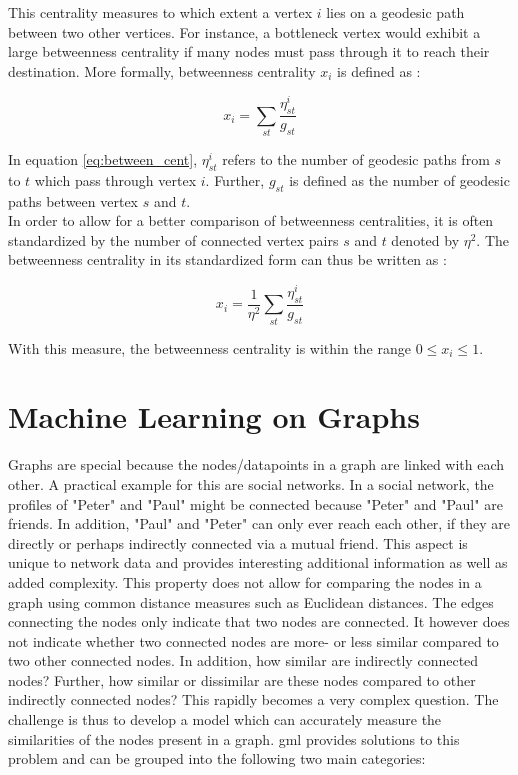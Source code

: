 	\noindent This centrality measures to which extent a vertex $i$ lies on 
	a geodesic path between two other vertices. For instance, a bottleneck 
	vertex would exhibit a large betweenness centrality if many nodes must pass 
	through it to reach their destination. More formally, betweenness 
	centrality $x_i$ is defined as \citep[p. 187]{Newman2010}:

	\begin{equation}
		x_i = \sum_{st} \frac{\eta_{st}^i}{g_{st}}
		\label{eq:between_cent}
	\end{equation}

	\noindent In equation \ref{eq:between_cent}, $\eta_{st}^i$ refers to the 
	number of geodesic paths from $s$ to $t$ which pass through vertex $i$. 
	Further, $g_{st}$ is defined as the number of geodesic paths between vertex 
	$s$ and $t$. \\

	\noindent In order to allow for a better comparison of betweenness
	centralities, it is often standardized by the number of connected vertex
	pairs $s$ and $t$ denoted by $\eta^2$. The betweenness centrality in its
	standardized form can thus be written as \citep[p.190]{Newman2010}:

	\begin{equation}
		x_i = \frac{1}{\eta^2}\sum_{st} \frac{\eta_{st}^i}{g_{st}}
	\end{equation}

	\noindent With this measure, the betweenness centrality is within the range
	$0\leqslant x_{i}\leqslant1$.

	\section{Machine Learning on Graphs}

	\noindent Graphs are special because the nodes/datapoints in a graph are 
	linked with each other. A practical example for this are social 
	networks. In a social network, the profiles of "Peter" and "Paul" might be 
	connected because "Peter" and "Paul" are friends. In addition, "Paul" and 
	"Peter" can only ever reach each other, if they are directly or perhaps 
	indirectly connected via a mutual friend. This aspect is unique to network 
	data and provides interesting additional information as well as added
	complexity. This property does not allow for comparing the nodes in a graph
	using common distance measures such as Euclidean distances. The edges
	connecting the nodes only indicate that two nodes are connected. It
	however does not indicate whether two connected nodes are more- or less 
	similar compared to two other connected nodes. In addition, how similar are 
	indirectly connected nodes? Further, how similar or dissimilar are these 
	nodes compared to other indirectly connected nodes? This rapidly becomes a 
	very complex question. The challenge is thus to develop a model which can 
	accurately measure the similarities of the nodes present in a graph. 
	\acs{gml} provides solutions to this problem and can be grouped into the 
	following two main categories:

